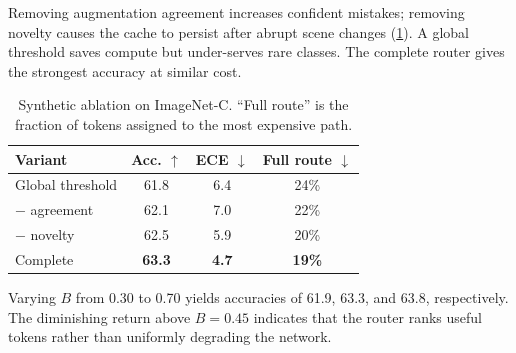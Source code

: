 Removing augmentation agreement increases confident mistakes; removing
novelty causes the cache to persist after abrupt scene changes
(\cref{tab:ablation}).  A global threshold saves compute but under-serves rare
classes.  The complete router gives the strongest accuracy at similar cost.

\begin{table}[t]
  \centering
  \caption{Synthetic ablation on ImageNet-C.  ``Full route'' is the fraction
  of tokens assigned to the most expensive path.}
  \label{tab:ablation}
  \begin{tabular}{lccc}
    \toprule
    Variant & Acc. $\uparrow$ & ECE $\downarrow$ & Full route $\downarrow$\\
    \midrule
    Global threshold & 61.8 & 6.4 & 24\%\\
    $-$ agreement & 62.1 & 7.0 & 22\%\\
    $-$ novelty & 62.5 & 5.9 & 20\%\\
    \rowcolor{palegreen}
    Complete \method{} & \textbf{63.3} & \textbf{4.7} & \textbf{19\%}\\
    \bottomrule
  \end{tabular}
\end{table}

Varying $B$ from 0.30 to 0.70 yields accuracies of 61.9, 63.3, and 63.8,
respectively.  The diminishing return above $B=0.45$ indicates that the router
ranks useful tokens rather than uniformly degrading the network.

